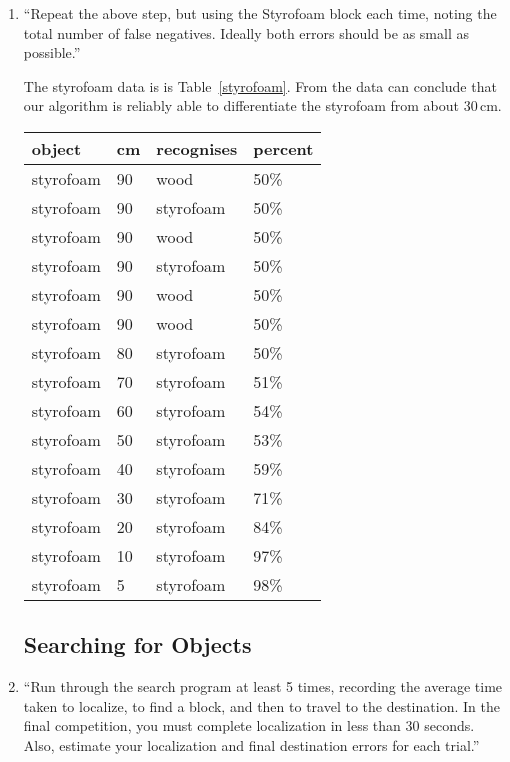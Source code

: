 \documentclass[twocolumn]{article}
\begin{document}
\begin{enumerate}
\item
``Repeat the above step, but using the Styrofoam block each time, noting the total number of false negatives. Ideally both errors should be as small as possible.\cite{lab5}''

The styrofoam data is is Table~\ref{styrofoam}. From the data can conclude that our algorithm is reliably able to differentiate the styrofoam from about 30\,cm.

\begin{table*}[htb]\footnotesize
\begin{center}\begin{tabular}{llll}
object& cm& recognises& percent \\
\hline
styrofoam& 90& wood& 50\% \\
styrofoam& 90& styrofoam& 50\% \\
styrofoam& 90& wood& 50\% \\
styrofoam& 90& styrofoam& 50\% \\
styrofoam& 90& wood& 50\% \\
styrofoam& 90& wood& 50\% \\
styrofoam& 80& styrofoam& 50\% \\
styrofoam& 70& styrofoam& 51\% \\
styrofoam& 60& styrofoam& 54\% \\
styrofoam& 50& styrofoam& 53\% \\
styrofoam& 40& styrofoam& 59\% \\
styrofoam& 30& styrofoam& 71\% \\
styrofoam& 20& styrofoam& 84\% \\
styrofoam& 10& styrofoam& 97\% \\
styrofoam&  5& styrofoam& 98\% \\
\end{tabular}\end{center}
\caption{Distance that the colour sensor can differentiate a styrofoam block.}
\label{styrofoam}
\end{table*}

\subsection{Searching for Objects}

\item
``Run through the search program at least 5 times, recording the average time taken to localize, to find a block, and then to travel to the destination. In the final competition, you must complete localization in less than 30 seconds. Also, estimate your localization and final destination errors for each trial.\cite{lab5}''


\end{enumerate}
\end{document}
